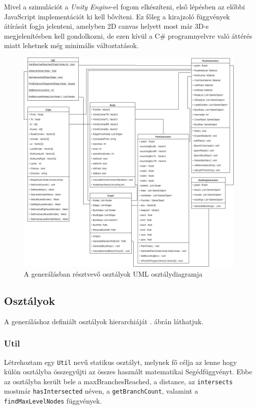 
Mivel a szimulációt a \textit{Unity Engine}-el fogom elkészíteni, első lépésben az előbbi JavaScript implementációt ki kell bővíteni. Ez főleg a kirajzoló függvények átírását fogja jelenteni, amelyben 2D canvas helyett most már 3D-s megjelenítésben kell gondolkozni, de ezen kívül a C\# programnyelvre való áttérés miatt lehetnek még minimális változtatások.

\begin{figure}[H]
\includegraphics[scale=0.45,keepaspectratio]{generateuml.png}
\caption{A generálásban résztvevő osztályok UML osztálydiagramja}
\label{fig:genuml}
\end{figure}

\subsection{Osztályok}

A generáláshoz definiált osztályok hierarchiáját . ábrán láthatjuk.

\subsubsection{Util}

Létrehoztam egy \texttt{Util} nevű statikus osztályt, melynek fő célja az lenne hogy külön osztályba összegyűjti az összes használt matematikai Segédfüggvényt. Ebbe az osztályba került bele a maxBranchesReached, a distance, az \texttt{intersects} mostmár \texttt{hasIntersected} néven, a \texttt{getBranchCount}, valamint a \texttt{findMaxLevelNodes} függvények. 

